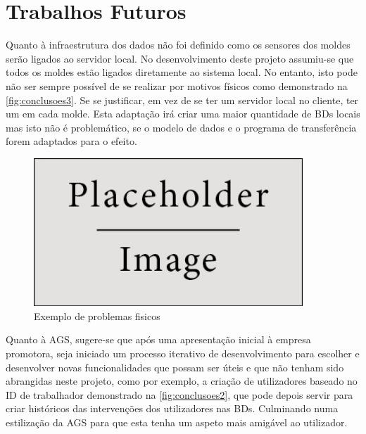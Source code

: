 \documentclass[11pt,twoside,a4paper]{report}
\begin{document}
\section{Trabalhos Futuros}
Quanto à infraestrutura dos dados não foi definido como os sensores dos moldes serão ligados ao servidor local. No desenvolvimento deste projeto assumiu-se que todos os moldes estão ligados diretamente ao sistema local. No entanto, isto pode não ser sempre possível de se realizar por motivos físicos como demonstrado na \autoref{fig:conclusoes3}. Se se justificar, em vez de se ter um servidor local no cliente, ter um em cada molde. Esta adaptação irá criar uma maior quantidade de BDs locais mas isto não é problemático, se o modelo de dados e o programa de transferência forem adaptados para o efeito.\par
\begin{figure}[H]
	\begin{center}
		\includegraphics[width=0.9\textwidth]{placeholder} %
		\caption{Exemplo de problemas fisicos}
		\label{fig:conclusoes3}
	\end{center}
\end{figure}
Quanto à AGS, sugere-se que após uma apresentação inicial à empresa promotora, seja iniciado um processo iterativo de desenvolvimento para escolher e desenvolver novas funcionalidades que possam ser úteis e que não tenham sido abrangidas neste projeto, como por exemplo, a criação de utilizadores baseado no ID de trabalhador demonstrado na \autoref{fig:conclusoes2}, que pode depois servir para criar históricos das intervenções dos utilizadores nas BDs. Culminando numa estilização da AGS para que esta tenha um aspeto mais amigável ao utilizador.
\end{document}
